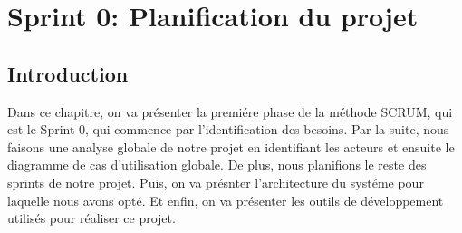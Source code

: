 \chapter{Sprint 0: Planification du projet}
\localtableofcontents
\section{Introduction}
\noindent
Dans ce chapitre, on va présenter la premiére phase de la méthode SCRUM, qui est le Sprint 0, qui commence par l'identification des besoins. Par la suite, nous faisons une analyse globale de notre projet en identifiant les acteurs et ensuite le diagramme de cas d'utilisation globale. De plus, nous planifions le reste des sprints de notre projet. Puis, on va présnter l'architecture du systéme pour laquelle nous avons opté. Et enfin, on va présenter les outils de développement utilisés pour réaliser ce projet.






